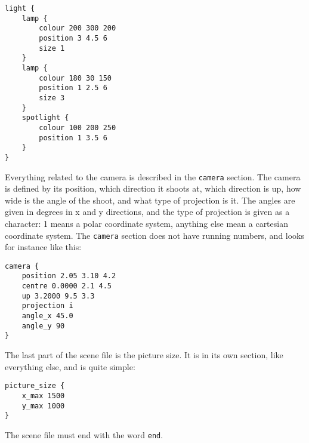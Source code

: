 \begin{verbatim}
light {
    lamp {
        colour 200 300 200
        position 3 4.5 6
        size 1
    }
    lamp {
        colour 180 30 150
        position 1 2.5 6
        size 3
    }
    spotlight {
        colour 100 200 250
        position 1 3.5 6
    }
}
\end{verbatim}

Everything related to the camera is described in the \texttt{camera} section. The camera is defined by its position, which direction it shoots at, which direction is up, how wide is the angle of the shoot, and what type of projection is it. The angles are given in degrees in x and y directions, and the type of  projection is given as a character: 1 means a polar coordinate system, anything else mean a cartesian coordinate system. The \texttt{camera} section does not have running numbers, and looks for instance like this:

\begin{verbatim}
camera {
    position 2.05 3.10 4.2
    centre 0.0000 2.1 4.5
    up 3.2000 9.5 3.3
    projection i
    angle_x 45.0
    angle_y 90
}
\end{verbatim}

The last part of the scene file is the picture size. It is in its own section, like everything else, and is quite simple:

\begin{verbatim}
picture_size {
    x_max 1500
    y_max 1000
}
\end{verbatim}
The scene file must end with the word \texttt{end}.
